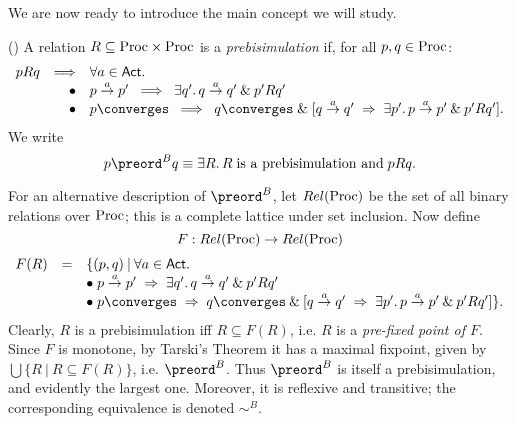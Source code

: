 We are now ready to introduce the main concept we will study.

\begin{definition}
{\rm (\cite{Par81,Mil80,Mil81})
A relation $R \subseteq {\rm Proc} \times {\rm Proc}$ is a {\em prebisimulation} if, for all $p, q \in {\rm Proc}$:
\[ \begin{array}{lrl}
p R q & \Longrightarrow & \forall a \in {\sf Act} . \\
& \bullet & p \stackrel{a}{\rightarrow} p' \;\; \Longrightarrow \;\; \exists q' . \, q \stackrel{a}{\rightarrow} q' \: \& \: p' R q' \\
& \bullet & p \converges \;\; \Longrightarrow \;\; q \converges \; \& \; [q \stackrel{a}{\rightarrow} q' \; \Rightarrow \; \exists p' . \, p \stackrel{a}{\rightarrow} p' \: \& \: p' R q'] .
\end{array} \]
We write
\[ p \preord^{B} q \equiv \exists R . \, R \; \mbox{is a prebisimulation and} \; p R q . \] }
\end{definition}

For an alternative description of $\preord^{B}$, let $Rel({\rm Proc})$ be the set of all binary relations over ${\rm Proc}$; this is a complete lattice under set inclusion. Now define
\[ F : Rel({\rm Proc}) \rightarrow Rel({\rm Proc}) \]
\[ \begin{array}{lrl}
F(R) & = & \{ (p, q) \: | \: \forall a \in {\sf Act} . \\
& & \bullet \; p \stackrel{a}{\rightarrow} p' \; \Rightarrow \; \exists q' . \, q \stackrel{a}{\rightarrow} q' \: \& \: p' R q' \\
& & \bullet \; p \converges \; \Rightarrow \; q \converges \: \& \:  [q \stackrel{a}{\rightarrow} q' \; \Rightarrow \; \exists p' . \, p \stackrel{a}{\rightarrow} p' \: \& \: p' R q'] \} .
\end{array} \]
Clearly, $R$ is a prebisimulation iff $R \subseteq F(R)$, i.e. $R$ is a {\em pre-fixed point of $F$}. Since $F$ is monotone, by Tarski's Theorem it has a maximal fixpoint, given by $\bigcup \{ R \: | \: R \subseteq F(R) \}$, i.e. $\preord^{B}$. Thus $\preord^{B}$ is itself a prebisimulation, and evidently the largest one. Moreover, it is reflexive and transitive; the corresponding equivalence is denoted $\sim^{B}$.

